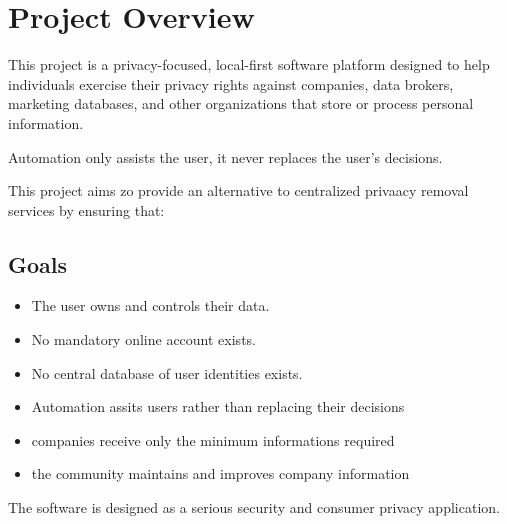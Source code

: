 
\chapter{Project Overview}

This project is a privacy-focused, local-first software platform designed to help individuals exercise their privacy rights against companies, data brokers, marketing databases, and other organizations that store or process personal information.

\begin{sentinelnote}
Automation only assists the user, it never replaces the user's decisions.
\end{sentinelnote}

This project aims zo provide an alternative to centralized privaacy removal services by ensuring that:

\section{Goals}
\begin{itemize}
  \item The user owns and controls their data.
  \item No mandatory online account exists.
  \item No central database of user identities exists.
  \item Automation assits users rather than replacing their decisions
  \item companies receive only the minimum informations required
  \item the community maintains and improves company information
\end{itemize}

The software is designed as a serious security and consumer privacy application.

\sentinelchapterend
